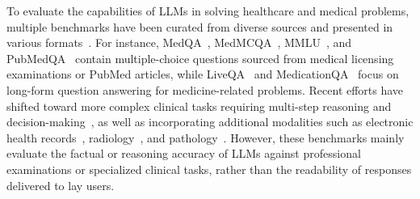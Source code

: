 To evaluate the capabilities of LLMs in solving healthcare and medical problems, multiple benchmarks have been curated from diverse sources and presented in various formats~\citep{singhal2023large, lievin2024can, thirunavukarasu2023large}.
For instance, MedQA~\citep{jin2021disease}, MedMCQA~\citep{pal2022medmcqa}, MMLU~\citep{hendrycks2020measuring, wang2024mmlu}, and PubMedQA~\citep{jin2019pubmedqa} contain multiple-choice questions sourced from medical licensing examinations or PubMed articles, while LiveQA~\citep{abacha2017overview} and MedicationQA~\citep{abacha2019bridging} focus on long-form question answering for medicine-related problems.
Recent efforts have shifted toward more complex clinical tasks requiring multi-step reasoning and decision-making~\citep{yao2024medqa, chen2025benchmarking,nori2024medprompt,saab2024capabilities}, as well as incorporating additional modalities such as electronic health records~\citep{ou2025experience, bardhan2022drugehrqa, kweon2024ehrnoteqa}, radiology~\citep{zuo2025medxpertqa, liu2021slake}, and pathology~\citep{he2020pathvqa,lu2024multimodal}.
However, these benchmarks mainly evaluate the factual or reasoning accuracy of LLMs against professional examinations or specialized clinical tasks, rather than the readability of responses delivered to lay users.

